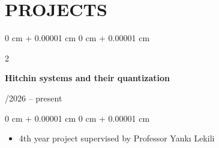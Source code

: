 \documentclass[10pt, letterpaper]{article}
\newenvironment{highlights}{
    \begin{itemize}[
        topsep=0.10 cm,
        parsep=0.10 cm,
        partopsep=0pt,
        itemsep=0pt,
        leftmargin=0 cm + 10pt
    ]
}{
    \end{itemize}
}
\newenvironment{onecolentry}{
    \begin{adjustwidth}{
        0 cm + 0.00001 cm
    }{
        0 cm + 0.00001 cm
    }
}{
    \end{adjustwidth}
}
\newenvironment{twocolentry}[2][]{
    \onecolentry
    \def\secondColumn{#2}
    \setcolumnwidth{\fill, 4.5 cm}
    \begin{paracol}{2}
}{
    \switchcolumn \raggedleft \secondColumn
    \end{paracol}
    \endonecolentry
} %
\begin{document}

    \section{PROJECTS}

        \begin{twocolentry}{
            10/2026 -- present
        }
            \textbf{Hitchin systems and their quantization}
        \end{twocolentry}

        \vspace{0.10 cm}
        \begin{onecolentry}
            \begin{highlights}
                \item 4th year project supervised by Professor Yankı Lekili
            \end{highlights}
        \end{onecolentry}
\end{document}
